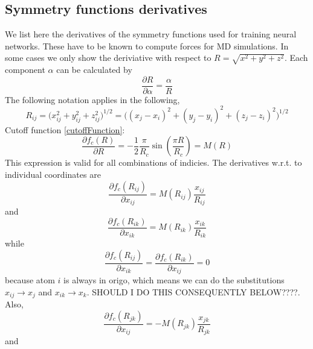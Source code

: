 \documentclass[twoside,english]{uiofysmaster}
\begin{document}
\begin{appendices}

\chapter{Symmetry functions derivatives} \label{app:appendixA1}
We list here the derivatives of the symmetry functions used for training neural networks. These have to be known
to compute forces for MD simulations. In some cases we only show the deriviative with respect to 
$R = \sqrt{x^2 + y^2 + z^2}$. 
Each component $\alpha$ can be calculated by
\begin{equation}
 \frac{\partial R}{\partial \alpha} = \frac{\alpha}{R}
\end{equation}
The following notation applies in the following,
\begin{equation}
 R_{ij} = \Bigr(x_{ij}^2 + y_{ij}^2 + z_{ij}^2\Bigr)^{1/2} =
 \Bigr((x_j - x_i)^2 + (y_j - y_i)^2 + (z_j - z_i)^2\Bigr)^{1/2}
\end{equation}
Cutoff function \eqref{cutoffFunction}:
\begin{equation}
 \frac{\partial f_c(R)}{\partial R} = -\frac{1}{2}\frac{\pi}{R_c} \sin\left(\frac{\pi R}{R_c}\right) = M(R)
 \label{cutOffFunctionDerivative}
\end{equation}
This expression is valid for all combinations of indicies. The derivatives w.r.t. to individual coordinates are
\begin{equation}
 \frac{\partial f_c(R_{ij})}{\partial x_{ij}} = M(R_{ij})
 \frac{x_{ij}}{R_{ij}}
 \label{cutOffFunctionDerivative1}
\end{equation}
and 
\begin{equation}
 \frac{\partial f_c(R_{ik})}{\partial x_{ik}} = M(R_{ik})
 \frac{x_{ik}}{R_{ik}}
 \label{cutOffFunctionDerivative1}
\end{equation}
while
\begin{equation}
 \frac{\partial f_c(R_{ij})}{\partial x_{ik}} = \frac{\partial f_c(R_{ik})}{\partial x_{ij}} = 0
\end{equation}
because atom $i$ is always in origo, which means we can do the substitutions $x_{ij} \rightarrow x_{j}$ and 
$x_{ik} \rightarrow x_{k}$. SHOULD I DO THIS CONSEQUENTLY BELOW????. Also, 
\begin{equation}
 \frac{\partial f_c(R_{jk})}{\partial x_{ij}} = -M(R_{jk})
 \frac{x_{jk}}{R_{jk}}
 \label{cutOffFunctionDerivative1}
\end{equation}
and 
\begin{equation}

\end{equation}
\end{appendices}
\end{document}
